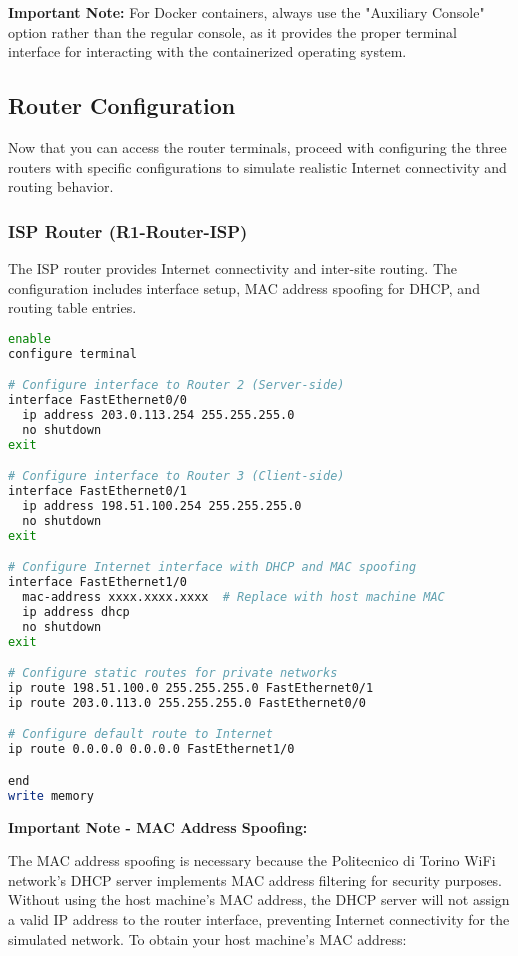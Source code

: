 \textbf{Important Note:} For Docker containers, always use the "Auxiliary Console" option rather than the regular console, as it provides the proper terminal interface for interacting with the containerized operating system.

\subsection{Router Configuration}

Now that you can access the router terminals, proceed with configuring the three routers with specific configurations to simulate realistic Internet connectivity and routing behavior.

\subsubsection{ISP Router (R1-Router-ISP)}

The ISP router provides Internet connectivity and inter-site routing. The configuration includes interface setup, MAC address spoofing for DHCP, and routing table entries.

\begin{lstlisting}[language=bash]
enable
configure terminal

# Configure interface to Router 2 (Server-side)
interface FastEthernet0/0
  ip address 203.0.113.254 255.255.255.0
  no shutdown
exit

# Configure interface to Router 3 (Client-side)  
interface FastEthernet0/1
  ip address 198.51.100.254 255.255.255.0
  no shutdown
exit

# Configure Internet interface with DHCP and MAC spoofing
interface FastEthernet1/0
  mac-address xxxx.xxxx.xxxx  # Replace with host machine MAC
  ip address dhcp
  no shutdown
exit

# Configure static routes for private networks
ip route 198.51.100.0 255.255.255.0 FastEthernet0/1
ip route 203.0.113.0 255.255.255.0 FastEthernet0/0

# Configure default route to Internet
ip route 0.0.0.0 0.0.0.0 FastEthernet1/0

end
write memory
\end{lstlisting}

\noindent
\textbf{Important Note - MAC Address Spoofing:} 

\noindent
The MAC address spoofing is necessary because the Politecnico di Torino WiFi network's DHCP server implements MAC address filtering for security purposes. Without using the host machine's MAC address, the DHCP server will not assign a valid IP address to the router interface, preventing Internet connectivity for the simulated network. To obtain your host machine's MAC address:

